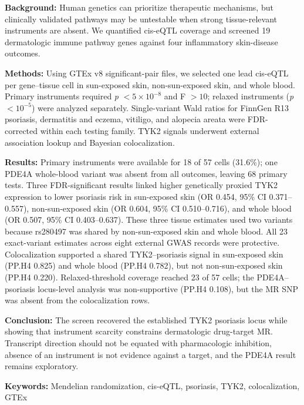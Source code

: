 \noindent\textbf{Background:} Human genetics can prioritize therapeutic mechanisms, but clinically validated pathways may be untestable when strong tissue-relevant instruments are absent. We quantified cis-eQTL coverage and screened 19 dermatologic immune pathway genes against four inflammatory skin-disease outcomes.

\noindent\textbf{Methods:} Using GTEx v8 significant-pair files, we selected one lead cis-eQTL per gene--tissue cell in sun-exposed skin, non-sun-exposed skin, and whole blood. Primary instruments required \textit{p} $<5\times10^{-8}$ and F $>10$; relaxed instruments (\textit{p} $<10^{-5}$) were analyzed separately. Single-variant Wald ratios for FinnGen R13 psoriasis, dermatitis and eczema, vitiligo, and alopecia areata were FDR-corrected within each testing family. TYK2 signals underwent external association lookup and Bayesian colocalization.

\noindent\textbf{Results:} Primary instruments were available for 18 of 57 cells (31.6\%); one PDE4A whole-blood variant was absent from all outcomes, leaving 68 primary tests. Three FDR-significant results linked higher genetically proxied TYK2 expression to lower psoriasis risk in sun-exposed skin (OR 0.454, 95\% CI 0.371--0.557), non-sun-exposed skin (OR 0.604, 95\% CI 0.510--0.716), and whole blood (OR 0.507, 95\% CI 0.403--0.637). These three tissue estimates used two variants because rs280497 was shared by non-sun-exposed skin and whole blood. All 23 exact-variant estimates across eight external GWAS records were protective. Colocalization supported a shared TYK2--psoriasis signal in sun-exposed skin (PP.H4 0.825) and whole blood (PP.H4 0.782), but not non-sun-exposed skin (PP.H4 0.220). Relaxed-threshold coverage reached 23 of 57 cells; the PDE4A--psoriasis locus-level analysis was non-supportive (PP.H4 0.108), but the MR SNP was absent from the colocalization rows.

\noindent\textbf{Conclusion:} The screen recovered the established TYK2 psoriasis locus while showing that instrument scarcity constrains dermatologic drug-target MR. Transcript direction should not be equated with pharmacologic inhibition, absence of an instrument is not evidence against a target, and the PDE4A result remains exploratory.

\noindent\textbf{Keywords:} Mendelian randomization, cis-eQTL, psoriasis, TYK2, colocalization, GTEx